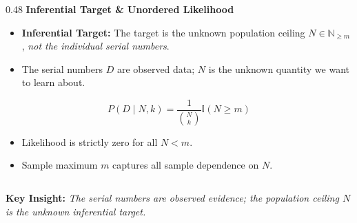 \documentclass[aspectratio=169,10pt]{beamer}
\begin{document}
\begin{frame}[c]
\begin{columns}[t,onlytextwidth]
    \begin{column}{0.48\textwidth}
      {\small \textbf{\color{headernavy} Inferential Target \& Unordered Likelihood}}\\[0.08cm]
      {\scriptsize
      \begin{itemize}
        \setlength{\itemsep}{0.08cm}
        \item \textbf{Inferential Target:} The target is the unknown population ceiling $N \in \mathbb{N}_{\ge m}$, \textit{not the individual serial numbers}.
        \item The serial numbers $D$ are observed data; $N$ is the unknown quantity we want to learn about.
      \end{itemize}
      \begin{equation*}
        P(D \mid N, k) = \frac{1}{\binom{N}{k}} \mathbb{I}(N \ge m)
      \end{equation*}
      \begin{itemize}
        \setlength{\itemsep}{0.08cm}
        \item Likelihood is strictly zero for all $N < m$.
        \item Sample maximum $m$ captures all sample dependence on $N$.
      \end{itemize}}
    \end{column}
  \end{columns}
  
  \vspace{0.25cm}
  \begin{center}
    {\footnotesize \textbf{\color{headernavy} Key Insight: } \textit{The serial numbers are observed evidence; the population ceiling $N$ is the unknown inferential target.}}
  \end{center}
\end{frame}
\end{document}
